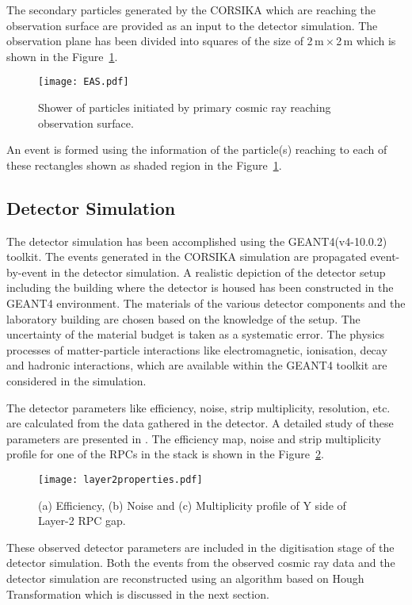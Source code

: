 The secondary particles generated by the CORSIKA which are reaching
the observation surface are provided as an input to the detector
simulation. The observation plane has been divided
into squares of the size of 2\,m\,$\times$\,2\,m which is shown in the
Figure~\ref{fig:eas}.
\begin{figure}[h]
  \centering
  \texttt{[image: EAS.pdf]} 
  \caption{Shower of particles initiated by primary cosmic ray
    reaching observation surface.}
  \label{fig:eas}
\end{figure}
An event is formed using the information of the particle(s) reaching
to each of these rectangles shown as shaded region in the
Figure~\ref{fig:eas}.


\subsection{Detector Simulation}
The detector simulation has been accomplished using the
GEANT4(v4-10.0.2) toolkit. The events generated in the CORSIKA
simulation are propagated event-by-event in the detector simulation.
A realistic depiction of the detector setup including the building
where the detector is housed has been constructed in the GEANT4
environment. The materials of the various detector components and
the laboratory building are chosen based on the knowledge of the
setup. The uncertainty of the material budget is taken as a systematic
error. The physics processes of matter-particle interactions 
like electromagnetic, ionisation, decay and hadronic interactions,
which are available within the GEANT4 toolkit are considered in the
simulation.

The detector parameters like efficiency, noise, strip multiplicity,
resolution, etc. are calculated from the data gathered in the
detector. A detailed study of these parameters are presented in
\cite{pethu1}. The efficiency map, noise and strip multiplicity
profile for one of the RPCs in the stack is shown in the
Figure~\ref{fig:layer2y}.
\begin{figure}[h]
  \centering
  \texttt{[image: layer2properties.pdf]} 
  \caption{(a) Efficiency, (b) Noise and (c) Multiplicity profile of
    Y side of Layer-2 RPC gap.}
  \label{fig:layer2y}
\end{figure}
These observed detector parameters are included in the digitisation
stage of the detector simulation. Both the events from the observed
cosmic ray data and the detector simulation are reconstructed using
an algorithm based on Hough Transformation which is discussed in the
next section.

